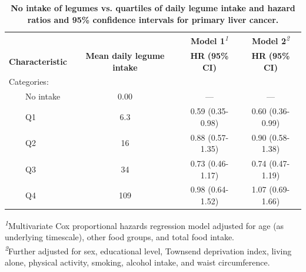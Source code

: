 \documentclass[nutrients,article,submit,moreauthors,pdftex]{Definitions/mdpi}
\begin{document}
\begin{table}[t]
\caption{
\label{tab:legume}\textbf{No intake of legumes vs. quartiles of daily legume intake and hazard ratios and 95\% confidence intervals for primary liver cancer.}}
\fontsize{9.0pt}{10.8pt}\selectfont
\begin{tabular*}{1\linewidth}{@{\extracolsep{\fill}}lccc}
\toprule
 &  & \textbf{Model 1}\textsuperscript{\textit{1}} & \textbf{Model 2}\textsuperscript{\textit{2}} \\
\cmidrule(lr){3-3} \cmidrule(lr){4-4}
\textbf{Characteristic} & \textbf{Mean daily legume intake} & \textbf{HR} \textbf{(95\% CI)} & \textbf{HR} \textbf{(95\% CI)} \\
\midrule\addlinespace[2.5pt]
Categories: &  &  &  \\
    No intake & 0.00 & — & — \\
    Q1 & 6.3 & 0.59 (0.35-0.98) & 0.60 (0.36-0.99) \\
    Q2 & 16 & 0.88 (0.57-1.35) & 0.90 (0.58-1.38) \\
    Q3 & 34 & 0.73 (0.46-1.17) & 0.74 (0.47-1.19) \\
    Q4 & 109 & 0.98 (0.64-1.52) & 1.07 (0.69-1.66) \\
\bottomrule
\end{tabular*}
\begin{minipage}{\linewidth}
\textsuperscript{\textit{1}}Multivariate Cox proportional hazards regression model adjusted for age (as underlying timescale), other food groups, and total food intake.\\
\textsuperscript{\textit{2}}Further adjusted for sex, educational level, Townsend deprivation index, living alone, physical activity, smoking, alcohol intake, and waist circumference.\\
\end{minipage}
\end{table}

\clearpage
\startlandscape
\end{document}
